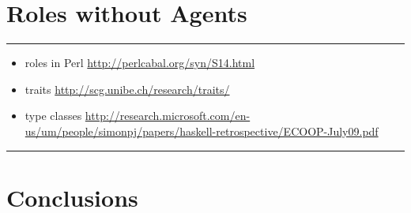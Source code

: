 \documentclass{article}
\newenvironment{notes}{\medskip\hrule\smallskip\narrower}{\smallskip\hrule\medskip}
\begin{document}
\section{Roles without Agents}\label{sec:other_roles} %

\begin{notes}
\begin{itemize}
\item roles in Perl \url{http://perlcabal.org/syn/S14.html}
\item traits \url{http://scg.unibe.ch/research/traits/}
\item type classes \url{http://research.microsoft.com/en-us/um/people/simonpj/papers/haskell-retrospective/ECOOP-July09.pdf}
\end{itemize}
\end{notes}

\section{Conclusions}\label{sec:conclusions} %



\end{document}
